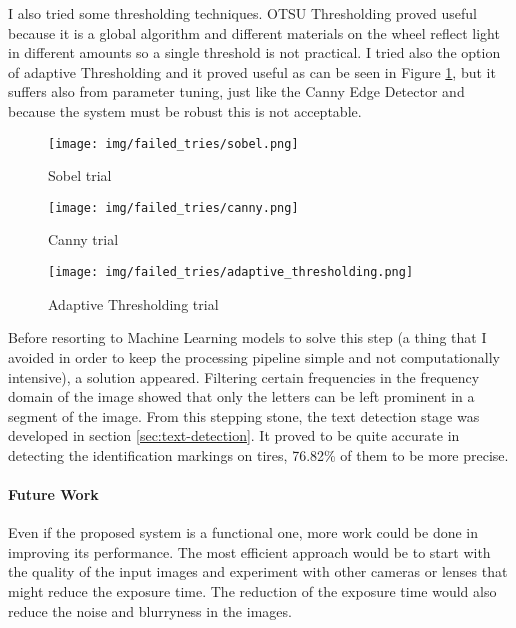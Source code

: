 I also tried some thresholding techniques. OTSU Thresholding proved useful because it is a global algorithm and different materials on the wheel reflect light in different amounts so a single threshold is not practical. I tried also the option of adaptive Thresholding and it proved useful as can be seen in Figure \ref{fig:failed-adaptive_tresholding}, but it suffers also from parameter tuning, just like the Canny Edge Detector and because the system must be robust this is not acceptable.

\begin{figure}
    \centering
    \begin{minipage}[c]{0.33\linewidth}
        \centering
        \texttt{[image: img/failed\_tries/sobel.png]}
            \caption{Sobel trial}
            \label{fig:failed-sobel}
    \end{minipage}\hfill
    \begin{minipage}[c]{0.33\linewidth}
        \centering
        \texttt{[image: img/failed\_tries/canny.png]}
            \caption{Canny trial}
            \label{fig:failed-canny}
    \end{minipage}\hfill
    \begin{minipage}[c]{0.33\linewidth}
        \centering
        \texttt{[image: img/failed\_tries/adaptive\_thresholding.png]}
        \caption{Adaptive Thresholding trial}
        \label{fig:failed-adaptive_tresholding}
    \end{minipage}\hfill
\end{figure}

Before resorting to Machine Learning models to solve this step (a thing that I avoided in order to keep the processing pipeline simple and not computationally intensive), a solution appeared. Filtering certain frequencies in the frequency domain of the image showed that only the letters can be left prominent in a segment of the image. From this stepping stone, the text detection stage was developed in section \ref{sec:text-detection}. It proved to be quite accurate in detecting the identification markings on tires, 76.82\% of them to be more precise.

\paragraph{Future Work}\mbox{}\par

Even if the proposed system is a functional one, more work could be done in improving its performance. The most efficient approach would be to start with the quality of the input images and experiment with other cameras or lenses that might reduce the exposure time. The reduction of the exposure time would also reduce the noise and blurryness in the images.


